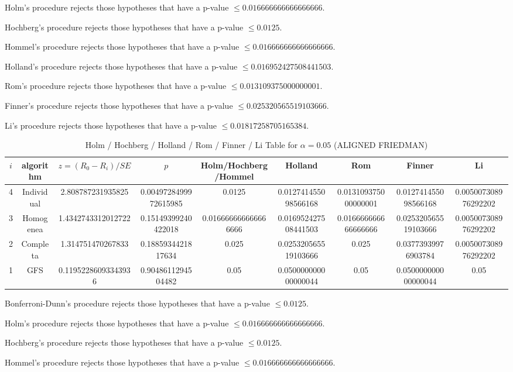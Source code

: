 \documentclass[a4paper,10pt]{article}
\begin{document}
\begin{landscape}
Holm's procedure rejects those hypotheses that have a p-value $\le0.016666666666666666$.


Hochberg's procedure rejects those hypotheses that have a p-value $\le0.0125$.


Hommel's procedure rejects those hypotheses that have a p-value $\le0.016666666666666666$.


Holland's procedure rejects those hypotheses that have a p-value $\le0.016952427508441503$.


Rom's procedure rejects those hypotheses that have a p-value $\le0.013109375000000001$.


Finner's procedure rejects those hypotheses that have a p-value $\le0.025320565519103666$.


Li's procedure rejects those hypotheses that have a p-value $\le0.01817258705165384$.



\newpage

\begin{table}[!htp]
\centering\scriptsize
\caption{Holm / Hochberg / Holland / Rom / Finner / Li Table for $\alpha=0.05$ (ALIGNED FRIEDMAN)}
\begin{tabular}{ccccccccc}
$i$&algorithm&$z=(R_0 - R_i)/SE$&$p$&Holm/Hochberg/Hommel&Holland&Rom&Finner&Li\\
\hline
4&Individual&2.808787231935825&0.0049728499972615985&0.0125&0.012741455098566168&0.013109375000000001&0.012741455098566168&0.005007308976292202\\
3&Homogenea&1.4342743312012722&0.15149399240422018&0.016666666666666666&0.016952427508441503&0.016666666666666666&0.025320565519103666&0.005007308976292202\\
2&Completa&1.314751470267833&0.1885934421817634&0.025&0.025320565519103666&0.025&0.03773939976903784&0.005007308976292202\\
1&GFS&0.11952286093343936&0.9048611294504482&0.05&0.050000000000000044&0.05&0.050000000000000044&0.05\\
\hline
\end{tabular}
\end{table}
Bonferroni-Dunn's procedure rejects those hypotheses that have a p-value $\le0.0125$.


Holm's procedure rejects those hypotheses that have a p-value $\le0.016666666666666666$.


Hochberg's procedure rejects those hypotheses that have a p-value $\le0.0125$.


Hommel's procedure rejects those hypotheses that have a p-value $\le0.016666666666666666$.



\end{landscape}
\end{document}

